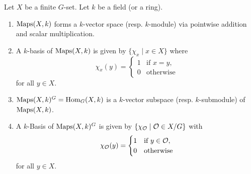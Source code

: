 \begin{lem}\label{lem: basis of Maps and Hom}
 Let $X$ be a finite $G$-set. Let $k$ be a field (or a ring).
 \begin{enumerate}[label=\emph{\alph*})]
  \item
   $\operatorname{Maps}(X,k)$ forms a $k$-vector space (resp. $k$-module) via pointwise addition and scalar multiplication.
  \item
   A $k$-basis of $\operatorname{Maps}(X,k)$ is given by $\{\chi_x \mid x \in X\}$ where
   \[
    \chi_x(y) =
    \begin{cases}
     1 & \text{if } x=y, \\
     0 & \text{otherwise}
    \end{cases}
   \]
   for all $y \in X$.
  \item
   $\operatorname{Maps}(X,k)^G = \operatorname{Hom}_G(X,k)$ is a $k$-vector subspace (resp. $k$-submodule) of $\operatorname{Maps}(X,k)$.
  \item
   A $k$-Basis of $\operatorname{Maps}(X,k)^G$ is given by $\{\chi_\mathcal{O} \mid \mathcal{O} \in X/G\}$ with
   \[
    \chi_\mathcal{O}(y) =
    \begin{cases}
     1 & \text{if } y \in \mathcal{O}, \\
     0 & \text{otherwise}
    \end{cases}
   \]
   for all $y \in X$.
 \end{enumerate}
\end{lem}
